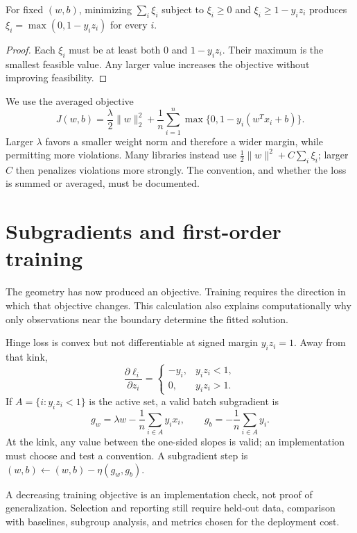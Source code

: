 \begin{proposition}
For fixed $(w,b)$, minimizing $\sum_i\xi_i$ subject to
$\xi_i\ge0$ and $\xi_i\ge1-y_i z_i$ produces
$\xi_i=\max(0,1-y_i z_i)$ for every $i$.
\end{proposition}

\begin{proof}
Each $\xi_i$ must be at least both $0$ and $1-y_i z_i$. Their maximum is the
smallest feasible value. Any larger value increases the objective without
improving feasibility.
\end{proof}

We use the averaged objective
\[
 J(w,b)=\frac{\lambda}{2}\lVert w\rVert_2^2
 +\frac1n\sum_{i=1}^n\max\{0,1-y_i(w^Tx_i+b)\}.
\]
Larger $\lambda$ favors a smaller weight norm and therefore a wider margin,
while permitting more violations. Many libraries instead use
$\tfrac12\lVert w\rVert^2+C\sum_i\xi_i$; larger $C$ then penalizes violations
more strongly. The convention, and whether the loss is summed or averaged,
must be documented.

\section{Subgradients and first-order training}

The geometry has now produced an objective. Training requires the direction in
which that objective changes. This calculation also explains computationally
why only observations near the boundary determine the fitted solution.

Hinge loss is convex but not differentiable at signed margin $y_i z_i=1$.
Away from that kink,
\[
 \frac{\partial \ell_i}{\partial z_i}=
 \begin{cases}
   -y_i,&y_i z_i<1,\\
   0,&y_i z_i>1.
 \end{cases}
\]
If $A=\{i:y_i z_i<1\}$ is the active set, a valid batch subgradient is
\[
 g_w=\lambda w-\frac1n\sum_{i\in A}y_i x_i,
 \qquad
 g_b=-\frac1n\sum_{i\in A}y_i.
\]
At the kink, any value between the one-sided slopes is valid; an
implementation must choose and test a convention. A subgradient step is
$(w,b)\leftarrow(w,b)-\eta(g_w,g_b)$.

\begin{warningbox}
A decreasing training objective is an implementation check, not proof of
generalization. Selection and reporting still require held-out data, comparison
with baselines, subgroup analysis, and metrics chosen for the deployment cost.
\end{warningbox}

